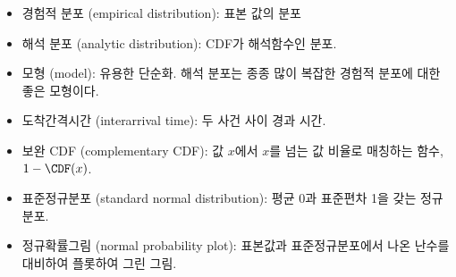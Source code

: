 \begin{itemize}

\item 경험적 분포 (empirical distribution): 표본 값의 분포 

\item 해석 분포 (analytic distribution): CDF가 해석함수인 분포.

\item 모형 (model): 유용한 단순화. 해석 분포는 종종 많이 복잡한 경험적 분포에 대한 좋은 모형이다.

\item 도착간격시간 (interarrival time): 두 사건 사이 경과 시간.

\item 보완 CDF (complementary CDF): 
값 $x$에서 $x$를 넘는 값 비율로 매칭하는 함수, $1 - \CDF(x)$.

\item 표준정규분포 (standard normal distribution): 
평균 0과 표준편차 1을 갖는 정규분포.

\item 정규확률그림 (normal probability plot): 표본값과 표준정규분포에서 나온 난수를 대비하여 플롯하여 그린 그림.

\end{itemize}

